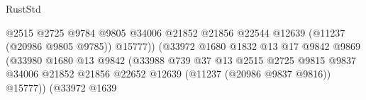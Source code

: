 \begin{lexlean}{RustStd}
\begin{coremodule}
                                                            @2515
                                                            @2725
                                                            @9784
                                                            @9805
                                                            @34006
                                                            @21852
                                                            @21856
                                                            @22544
                                                            @12639
                                                            (@11237 (@20986 @9805 @9785))
                                                            @15777))
                                                        (@33972
                                                          @1680
                                                          @1832
                                                          @13
                                                          @17
                                                          @9842
                                                          @9869
                                                          (@33980
                                                            @1680
                                                            @13
                                                            @9842
                                                            (@33988
                                                              @739
                                                              @37
                                                              @13
                                                              @2515
                                                              @2725
                                                              @9815
                                                              @9837
                                                              @34006
                                                              @21852
                                                              @21856
                                                              @22652
                                                              @12639
                                                              (@11237 (@20986 @9837 @9816))
                                                              @15777))
                                                          (@33972
                                                            @1639

\end{coremodule}
\end{lexlean}

